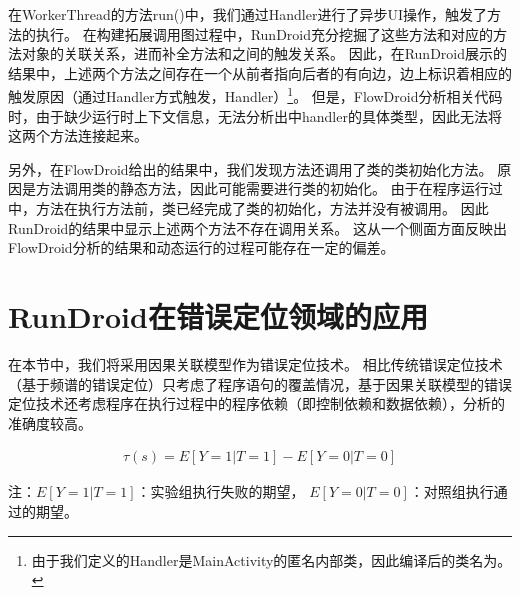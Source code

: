 
在WorkerThread的方法run()中，我们通过Handler进行了异步UI操作，触发了方法的执行。
在构建拓展调用图过程中，RunDroid充分挖掘了这些方法和对应的方法对象的关联关系，进而补全方法和之间的触发关系。
因此，在RunDroid展示的结果中，上述两个方法之间存在一个从前者指向后者的有向边，边上标识着相应的触发原因（通过Handler方式触发，Handler）\footnote{由于我们定义的Handler是MainActivity的匿名内部类，因此编译后的类名为。}。
但是，FlowDroid分析相关代码时，由于缺少运行时上下文信息，无法分析出中handler的具体类型，因此无法将这两个方法连接起来。






另外，在FlowDroid给出的结果中，我们发现方法还调用了类的类初始化方法。
原因是方法调用类的静态方法，因此可能需要进行类的初始化。
由于在程序运行过中，方法在执行方法前，类已经完成了类的初始化，方法并没有被调用。
因此RunDroid的结果中显示上述两个方法不存在调用关系。
这从一个侧面方面反映出FlowDroid分析的结果和动态运行的过程可能存在一定的偏差。





\section{RunDroid在错误定位领域的应用}
在本节中，我们将采用因果关联模型\cite{baah2010causal,baah2011mitigating}作为错误定位技术。
相比传统错误定位技术（基于频谱的错误定位）只考虑了程序语句的覆盖情况，基于因果关联模型的错误定位技术还考虑程序在执行过程中的程序依赖（即控制依赖和数据依赖），分析的准确度较高。



\begin{equation}
\begin{aligned}
\tau(s) = E[Y=1|T=1] - E [Y=0|T=0] 
\end{aligned}
\label{equ:expectEquation} 
\end{equation}
\begin{scriptsize}
	注：$E[Y=1|T=1]$：实验组执行失败的期望， $E[Y=0|T=0]$：对照组执行通过的期望。
\end{scriptsize}


